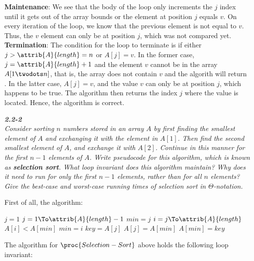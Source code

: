 \documentclass[8pt,a4paper]{article}
\begin{document}
\textbf{Maintenance}: We see that the body of the \While loop only increments the $j$ index
until it gets out of the array bounds or the element at position $j$ equals $v$. On
every iteration of the loop, we know that the previous element is not equal to $v$. Thus,
the $v$ element can only be at position $j$, which was not compared yet. \\

\textbf{Termination}: The condition for the \While loop to terminate is if either
$j > \attrib{A}{length} = n$ or $A[j] = v$. In the former case, $j = \attrib{A}{length} + 1$
and the element $v$ cannot be in the array $A[1 \twodots n]$, that is, the array does
not contain $v$ and the algorith will return . In the latter case, $A[j] = v$,
and the value $v$ can only be at position $j$, which happens to be true. The algorithm
then returns the index $j$ where the value is located. Hence, the algorithm is correct.

\begin{framed}
\textbf{\textit{2.2-2}} \\
\textit{Consider sorting $n$ numbers stored in an array $A$ by first finding the smallest
element of $A$ and exchanging it with the element in $A[1]$. Then find the second smallest
element of $A$, and exchange it with $A[2]$. Continue in this manner for the first $n - 1$
elements of $A$. Write pseudocode for this algorithm, which is known as \textbf{selection sort}.
What loop invariant does this algorithm maintain? Why does it need to run for only the first
$n - 1$ elements, rather than for all $n$ elements? Give the best-case and worst-case running
times of selection sort in $\Theta$-notation.
}
\end{framed}

First of all, the algorithm:

\begin{codebox}
  \li $j = 1$
  \li \For $j = 1 \To \attrib{A}{length} -1$  \label{ssort-loop-start}
        \Do
  \li     $min = j$
  \li     \For $i = j \To \attrib{A}{length}$
            \Do
  \li         \If $A[i] < A[min]$
                \Then
  \li             $min = i$
                \End
            \End
  \li     $key = A[j]$
  \li     $A[j] = A[min]$
  \li     $A[min] = key$
        \End                                  \label{ssort-loop-end}
\end{codebox}

The algorithm for $\proc{Selection-Sort}$ above holds the following loop invariant:
\end{document}
